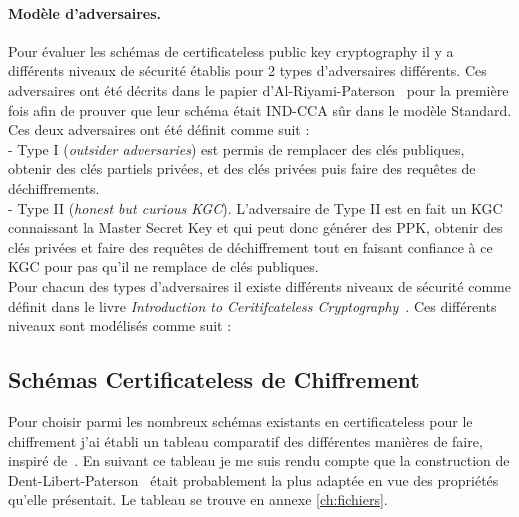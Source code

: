 \paragraph*{Modèle d'adversaires.}
Pour évaluer les schémas de certificateless public key cryptography il y a différents niveaux de sécurité établis pour 2 types d'adversaires différents. Ces adversaires ont été décrits dans le papier d'Al-Riyami-Paterson~\cite{DBLP:conf/asiacrypt/Al-RiyamiP03} pour la première fois afin de prouver que leur schéma était IND-CCA sûr dans le modèle Standard. Ces deux adversaires ont été définit comme suit :\\
- Type I (\textit{outsider adversaries}) est permis de remplacer des clés publiques, obtenir des clés partiels privées, et des clés privées puis faire des requêtes de déchiffrements.\\
- Type II (\textit{honest but curious KGC}). L'adversaire de Type II est en fait un KGC connaissant la Master Secret Key et qui peut donc générer des PPK, obtenir des clés privées et faire des requêtes de déchiffrement tout en faisant confiance à ce KGC pour pas qu'il ne remplace de clés publiques.\\
Pour chacun des types d'adversaires il existe différents niveaux de sécurité comme définit dans le livre \textit{Introduction to Ceritifcateless Cryptography}~\cite{bookIntroCertificateless}. Ces différents niveaux sont modélisés comme suit : \\

\subsection{Schémas Certificateless de Chiffrement}
Pour choisir parmi les nombreux schémas existants en certificateless pour le chiffrement j'ai établi un tableau comparatif des différentes manières de faire, inspiré de~\cite{bookIntroCertificateless}. En suivant ce tableau je me suis rendu compte que la construction de Dent-Libert-Paterson~\cite{DBLP:conf/pkc/DentLP08} était probablement la plus adaptée en vue des propriétés qu'elle présentait. Le tableau se trouve en annexe \ref{ch:fichiers}.


